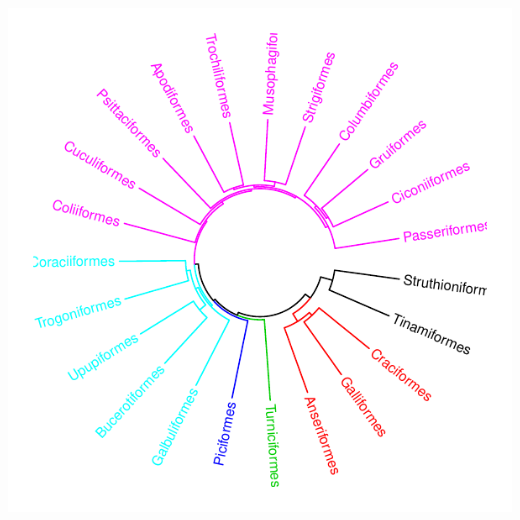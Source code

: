 \documentclass{article}\usepackage[]{graphicx}\usepackage[]{color}
\makeatletter
\def\maxwidth{ %
  \ifdim\Gin@nat@width>\linewidth
    \linewidth
  \else
    \Gin@nat@width
  \fi
}
\newenvironment{knitrout}{}{} %
\makeatother
\begin{document}
\begin{knitrout}
\color{fgcolor}

{\centering \includegraphics[width=\maxwidth]{figure/plot_circlize_dendo_2-1} 

}



\end{knitrout}
\end{document}
